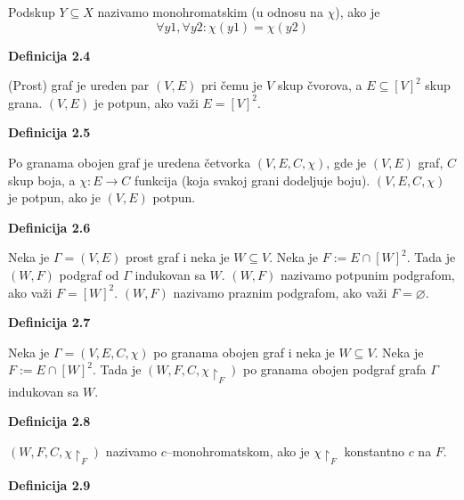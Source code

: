 \documentclass[12pt,a4paper]{article}
\begin{document}
	Podskup $Y \subseteq X$ nazivamo monohromatskim (u odnosu na $\chi$), ako je
	\[\forall y1, \forall y2 : \chi(y1) = \chi(y2)\]
	\vspace{1.5em}

	{\noindent\fontsize{12pt}{12pt}\textbf{Definicija 2.4}}
	\vspace{0.5em}

	\noindent (Prost) graf je ureden par $(V, E)$ pri čemu je $V$ skup čvorova, a $E \subseteq [V]^{2}$ skup grana.
	$(V, E)$ je potpun, ako važi $E = [V]^{2}$.
	\vspace{1.5em}

	{\noindent\fontsize{12pt}{12pt}\textbf{Definicija 2.5}}
	\vspace{0.5em}

	\noindent Po granama obojen graf je uredena četvorka $(V, E, C, \chi)$, gde je $(V, E)$ graf, $C$ skup boja,
	a $\chi : E \rightarrow C$ funkcija (koja svakoj grani dodeljuje boju).
	$(V, E, C, \chi)$ je potpun, ako je $(V, E)$ potpun.
	\vspace{1.5em}

	{\noindent\fontsize{12pt}{12pt}\textbf{Definicija 2.6}}
	\vspace{0.5em}

	\noindent Neka je $\Gamma = (V, E)$ prost graf i neka je $W \subseteq V$. Neka je $F := E \cap [W]^{2}$. 
	Tada je $(W , F)$	podgraf od $\Gamma$ indukovan sa $W$.
	$(W, F)$ nazivamo potpunim podgrafom, ako važi $F = [W]^{2}$.
	$(W, F)$ nazivamo praznim podgrafom, ako važi $F = \varnothing$.
	\vspace{1.5em}

	{\noindent\fontsize{12pt}{12pt}\textbf{Definicija 2.7}}
	\vspace{0.5em}

	\noindent Neka je $\Gamma = (V, E, C, \chi)$ po granama obojen graf i neka je $W \subseteq V$. 
	Neka je $F := E \cap [W]^{2}$.
	Tada je $(W , F, C, \chi\upharpoonright_{F})$ po granama obojen podgraf grafa $\Gamma$ indukovan sa $W$.
	\vspace{1.5em}

	{\noindent\fontsize{12pt}{12pt}\textbf{Definicija 2.8}}
	\vspace{0.5em}

	\noindent 	$(W , F, C, \chi\upharpoonright_{F})$ nazivamo $c$–monohromatskom, ako je $\chi\upharpoonright_{F}$ konstantno $c$ na $F$.
	\vspace{1.5em}


	{\noindent\fontsize{12pt}{12pt}\textbf{Definicija 2.9}}
	\vspace{0.5em}
\end{document}
